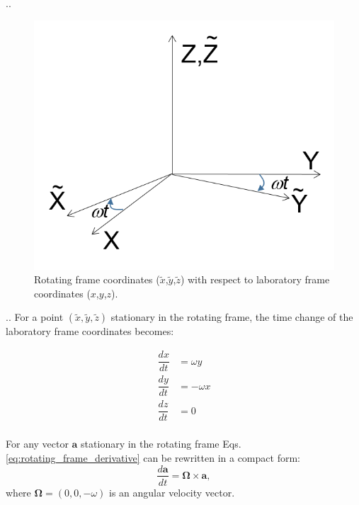 \documentclass[handout]{beamer}
\begin{document}
\begin{frame}[shrink=5]{\thesection.\thesubsection. \insertsubsection}
  \begin{figure}[ht] 
  	\caption{Rotating frame coordinates ($\tilde{x}$,$\tilde{y}$,$\tilde{z}$) with respect to laboratory frame coordinates ($x$,$y$,$z$). }
  	\label{fig:rot_frame}
  	\centering
  	\includegraphics[scale=0.3]{rotating_frame.png}
  \end{figure}
\end{frame}
\begin{frame}{\thesection.\thesubsection. \insertsubsection}For a point $(\tilde{x},\tilde{y},\tilde{z})$ stationary in the rotating frame, the time change of the laboratory frame coordinates becomes:
 
 \begin{equation} \label{eq:rotating_frame_derivative}
 \begin{array}{lcl}
 \dfrac{dx}{dt} &= \omega {y}  \\
 \dfrac{dy}{dt} &= -\omega {x}  \\
 \dfrac{dz}{dt} &= 0  \\
 \end{array}
 \end{equation} 
 
 For any vector $\bm{a}$ stationary in the rotating frame Eqs.\ref{eq:rotating_frame_derivative} can be rewritten in a compact form:
 \begin{equation}
 \dfrac{d\bm{a}}{dt} = \bm{\Omega} \times \bm{a},
 \end{equation}
 where $\bm{\Omega} = (0,0, -\omega)$ is an angular velocity vector.


\end{frame}
\end{document}
